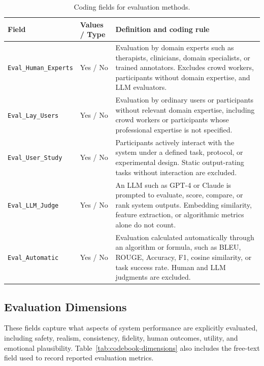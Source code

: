 \begin{table}[p]
\centering
\begin{tabular}{p{4.2cm}p{2.2cm}p{8.3cm}}
\toprule
\textbf{Field} & \textbf{Values / Type} & \textbf{Definition and coding rule} \\
\midrule

\texttt{Eval\_Human\_Experts}
&
Yes / No
&
Evaluation by domain experts such as therapists, clinicians, domain specialists, or trained annotators. Excludes crowd workers, participants without domain expertise, and LLM evaluators.
\\
\midrule

\texttt{Eval\_Lay\_Users}
&
Yes / No
&
Evaluation by ordinary users or participants without relevant domain expertise, including crowd workers or participants whose professional expertise is not specified.
\\
\midrule

\texttt{Eval\_User\_Study}
&
Yes / No
&
Participants actively interact with the system under a defined task, protocol, or experimental design. Static output-rating tasks without interaction are excluded.
\\
\midrule

\texttt{Eval\_LLM\_Judge}
&
Yes / No
&
An LLM such as GPT-4 or Claude is prompted to evaluate, score, compare, or rank system outputs. Embedding similarity, feature extraction, or algorithmic metrics alone do not count.
\\
\midrule

\texttt{Eval\_Automatic}
&
Yes / No
&
Evaluation calculated automatically through an algorithm or formula, such as BLEU, ROUGE, Accuracy, F1, cosine similarity, or task success rate. Human and LLM judgments are excluded.
\\

\bottomrule
\end{tabular}
\caption{Coding fields for evaluation methods.}
\label{tab:codebook-methods}
\end{table}


\subsection{Evaluation Dimensions}

These fields capture what aspects of system performance are explicitly evaluated, including safety, realism, consistency, fidelity, human outcomes, utility, and emotional plausibility. 
Table~\ref{tab:codebook-dimensions} also includes the free-text field used to record reported evaluation metrics.

